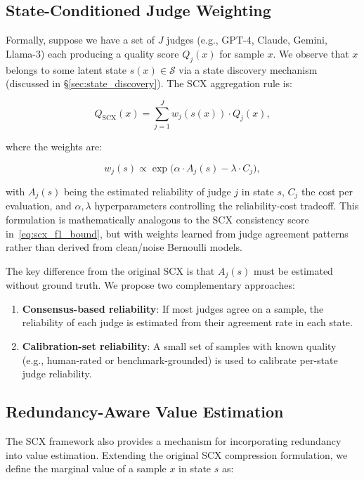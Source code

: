 \documentclass[11pt,twocolumn]{article}
\begin{document}
\subsection{State-Conditioned Judge Weighting}

Formally, suppose we have a set of $J$ judges (e.g., GPT-4, Claude, Gemini, Llama-3) each producing a quality score $Q_j(x)$ for sample $x$. We observe that $x$ belongs to some latent state $s(x) \in \mathcal{S}$ via a state discovery mechanism (discussed in \S\ref{sec:state_discovery}). The SCX aggregation rule is:

\begin{equation}
Q_{\text{SCX}}(x) = \sum_{j=1}^J w_j(s(x)) \cdot Q_j(x),
\label{eq:scx_aggregation}
\end{equation}

where the weights are:

\begin{equation}
w_j(s) \propto \exp\bigl(\alpha \cdot A_j(s) - \lambda \cdot C_j\bigr),
\label{eq:scx_weights}
\end{equation}

with $A_j(s)$ being the estimated reliability of judge $j$ in state $s$, $C_j$ the cost per evaluation, and $\alpha, \lambda$ hyperparameters controlling the reliability-cost tradeoff. This formulation is mathematically analogous to the SCX consistency score in~\eqref{eq:scx_f1_bound}, but with weights learned from judge agreement patterns rather than derived from clean/noise Bernoulli models.

The key difference from the original SCX is that $A_j(s)$ must be estimated without ground truth. We propose two complementary approaches:
\begin{enumerate}
    \item \textbf{Consensus-based reliability}: If most judges agree on a sample, the reliability of each judge is estimated from their agreement rate in each state.
    \item \textbf{Calibration-set reliability}: A small set of samples with known quality (e.g., human-rated or benchmark-grounded) is used to calibrate per-state judge reliability.
\end{enumerate}

\subsection{Redundancy-Aware Value Estimation}

The SCX framework also provides a mechanism for incorporating redundancy into value estimation. Extending the original SCX compression formulation, we define the marginal value of a sample $x$ in state $s$ as:
\end{document}
